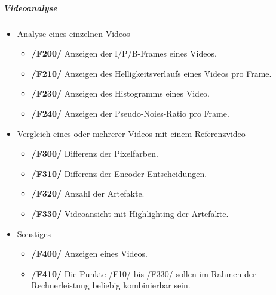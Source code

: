 \subparagraph{Videoanalyse}
\begin{itemize}
	\item Analyse eines einzelnen Videos  
		\begin{itemize}
			\item \textbf{/F200/} Anzeigen der I/P/B-Frames eines Videos.
			\item \textbf{/F210/} Anzeigen des Helligkeitsverlaufs eines Videos pro Frame.
			\item \textbf{/F230/} Anzeigen des Histogramms eines Video.
			\item \textbf{/F240/} Anzeigen der Pseudo-Noies-Ratio pro Frame.
		   \end{itemize} 
	\item Vergleich eines oder mehrerer Videos mit einem Referenzvideo
		\begin{itemize}
			\item \textbf{/F300/} Differenz der Pixelfarben.
			\item \textbf{/F310/} Differenz der Encoder-Entscheidungen.
			\item \textbf{/F320/} Anzahl der Artefakte.
			\item \textbf{/F330/} Videoansicht mit Highlighting der Artefakte.
		\end{itemize}	
	\item Sonstiges
		\begin{itemize}
			\item \textbf{/F400/} Anzeigen eines Videos. 
			\item \textbf{/F410/} Die Punkte /F10/ bis /F330/ sollen im Rahmen der Rechnerleistung beliebig kombinierbar sein.
		\end{itemize}
\end{itemize}

